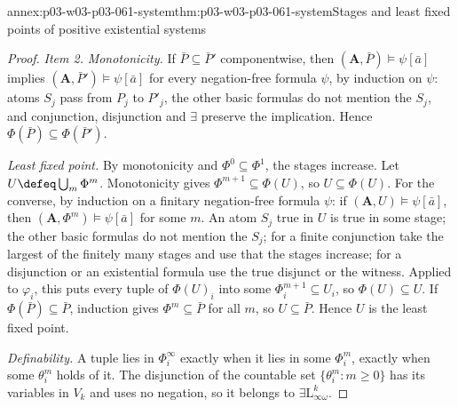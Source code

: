 \begin{annexitem}{annex:p03-w03-p03-061-system}{thm:p03-w03-p03-061-system}{Stages and least fixed points of positive existential systems}
\begin{proof}
\emph{Item 2.} \emph{Monotonicity.} If \(\bar P\subseteq\bar P'\)
componentwise, then \((\mathbf A,\bar P)\models\psi[\bar a]\) implies
\((\mathbf A,\bar P')\models\psi[\bar a]\) for every negation-free formula
\(\psi\), by induction on \(\psi\): atoms \(S_j\) pass from \(P_j\) to
\(P'_j\), the other basic formulas do not mention the \(S_j\), and
conjunction, disjunction and \(\exists\) preserve the implication. Hence
\(\Phi(\bar P)\subseteq\Phi(\bar P')\).

\emph{Least fixed point.} By monotonicity and \(\Phi^0\subseteq\Phi^1\), the
stages increase. Let \(U\defeq\bigcup_m\Phi^m\). Monotonicity gives
\(\Phi^{m+1}\subseteq\Phi(U)\), so \(U\subseteq\Phi(U)\). For the converse,
by induction on a finitary negation-free formula \(\psi\): if \((\mathbf
A,U)\models\psi[\bar a]\), then \((\mathbf A,\Phi^m)\models\psi[\bar a]\) for
some \(m\). An atom \(S_j\) true in \(U\) is true in some stage; the other
basic formulas do not mention the \(S_j\); for a finite conjunction take the
largest of the finitely many stages and use that the stages increase; for a
disjunction or an existential formula use the true disjunct or the witness.
Applied to \(\varphi_i\), this puts every tuple of \(\Phi(U)_i\) into some
\(\Phi^{m+1}_i\subseteq U_i\), so \(\Phi(U)\subseteq U\). If
\(\Phi(\bar P)\subseteq\bar P\), induction gives \(\Phi^m\subseteq\bar P\)
for all \(m\), so \(U\subseteq\bar P\). Hence \(U\) is the least fixed point.

\emph{Definability.} A tuple lies in \(\Phi^\infty_i\) exactly when it lies
in some \(\Phi^m_i\), exactly when some \(\theta^m_i\) holds of it. The
disjunction of the countable set \(\{\theta^m_i:m\ge0\}\) has its variables
in \(V_k\) and uses no negation, so it belongs to
\(\exists\mathrm L^k_{\infty\omega}\).
\end{proof}
\end{annexitem}

